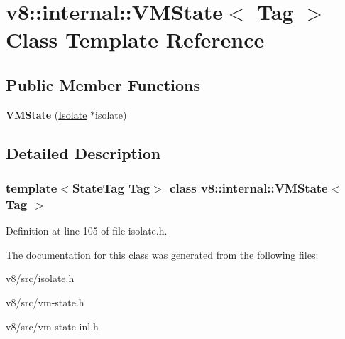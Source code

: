 \hypertarget{classv8_1_1internal_1_1VMState}{}\section{v8\+:\+:internal\+:\+:V\+M\+State$<$ Tag $>$ Class Template Reference}
\label{classv8_1_1internal_1_1VMState}
\subsection*{Public Member Functions}
\begin{DoxyCompactItemize}
\item 
\mbox{\label{classv8_1_1internal_1_1VMState_a4d7009802070608c7b716aa89d438614}} 
{\bfseries V\+M\+State} (\mbox{\hyperlink{classv8_1_1internal_1_1Isolate}{Isolate}} $\ast$isolate)
\end{DoxyCompactItemize}


\subsection{Detailed Description}
\subsubsection*{template$<$State\+Tag Tag$>$\newline
class v8\+::internal\+::\+V\+M\+State$<$ Tag $>$}



Definition at line 105 of file isolate.\+h.



The documentation for this class was generated from the following files\+:\begin{DoxyCompactItemize}
\item 
v8/src/isolate.\+h\item 
v8/src/vm-\/state.\+h\item 
v8/src/vm-\/state-\/inl.\+h\end{DoxyCompactItemize}
